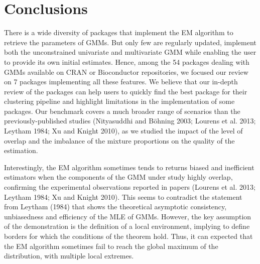\hypertarget{conclusions}{%
\section{Conclusions}\label{conclusions}}

There is a wide diversity of packages that implement the EM algorithm to
retrieve the parameters of GMMs. But only few are regularly updated,
implement both the unconstrained univariate and multivariate GMM while enabling the user to provide
its own initial estimates. Hence, among the 54 packages dealing
with GMMs available on CRAN or Bioconductor repositories, we focused our
review on 7 packages implementing all these features. We believe that our in-depth review of the packages can help users to quickly find the best package for their clustering
pipeline and highlight limitations in the implementation of some
packages. Our benchmark covers a much broader range of scenarios
than the previously-published studies (Nityasuddhi and Böhning 2003; Lourens et al. 2013; Leytham 1984; Xu and Knight 2010), as we studied the impact of the
level of overlap and the imbalance of the mixture proportions on the
quality of the estimation.

Interestingly, the EM algorithm sometimes tends to returns biased and
inefficient estimators when the components of the GMM under study highly overlap, confirming the experimental observations reported in papers (Lourens et al. 2013; Leytham 1984; Xu and Knight 2010). This seems to contradict the statement from Leytham (1984) that shows the theoretical asymptotic consistency, unbiasedness and efficiency of the MLE of GMMs. However, the key assumption of the demonstration is the definition of a local environment, implying to define borders for which the conditions of the theorem hold. Thus, it can expected that the EM algorithm sometimes fail to reach the global maximum of the distribution, with multiple local extremes.

